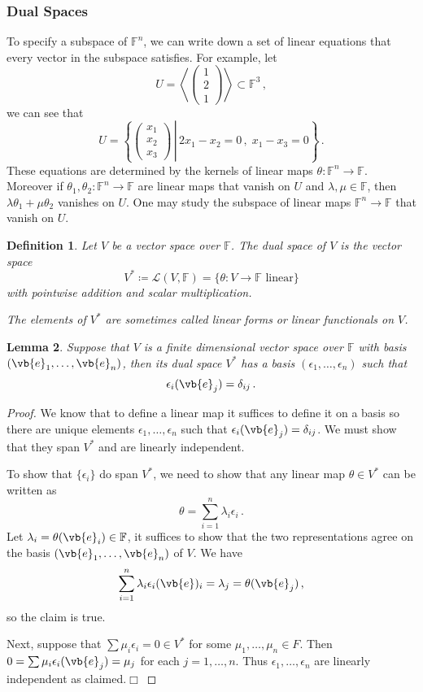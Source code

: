 \documentclass{article}
\theoremstyle{plain}\theoremheaderfont{\normalfont\itshape}\theorembodyfont{\rmfamily}\theoremseparator{.}\newtheorem*{rem}{Remark}\newtheorem*{ex}{Example}\newtheorem*{proof}{Proof}\newtheorem*{altp}{Alternative proof}
\theoremstyle{plain}\theoremheaderfont{\normalfont\bfseries}\theorembodyfont{\rmfamily}\theoremseparator{.}\newtheorem{thm}{Theorem}[section]\newtheorem{lem}[thm]{Lemma}\newtheorem{prop}[thm]{Proposition}\newtheorem*{cor}{Corollary}\newtheorem{defn}[thm]{Definition}\newtheorem{clm}[thm]{Claim}\newtheorem{clminproof}{Claim}
\theoremstyle{break}\theoremheaderfont{\normalfont\itshape}\theorembodyfont{\rmfamily}\theoremseparator{.\medskip}\newtheorem*{proofskip}{Proof}\newtheorem*{exs}{Examples}\newtheorem*{rems}{Remarks}
\theoremstyle{break}\theoremheaderfont{\normalfont\bfseries}\theorembodyfont{\rmfamily}\theoremseparator{.\medskip}\newtheorem{lemskip}[thm]{Lemma}\newtheorem{defnskip}[thm]{Definition}\newtheorem{propskip}[thm]{Proposition}\newtheorem{thmskip}[thm]{Theorem}
\numberwithin{equation}{section}
\newcommand{\qed}{\hfill\ensuremath{\Box}}
\begin{document}
	\subsubsection{Dual Spaces}
	To specify a subspace of \(\mathbb{F}^n\), we can write down a set of linear equations that every vector in the subspace satisfies. For example, let
	\[U=\left\langle \begin{pmatrix}
		1 \\ 2 \\ 1
	\end{pmatrix}\right\rangle\subset\mathbb{F}^3\,,\]
	we can see that
	\[U=\left\{\left.\begin{pmatrix}
		x_1 \\ x_2 \\ x_3
	\end{pmatrix}\,\right|\,2x_1-x_2=0\,,\;x_1-x_3=0\right\}\,.\]
	These equations are determined by the kernels of linear maps \(\theta:\mathbb{F}^n\to\mathbb{F}\). Moreover if \(\theta_1,\theta_2:\mathbb{F}^n\to\mathbb{F}\) are linear maps that vanish on \(U\) and \(\lambda,\mu\in\mathbb{F}\), then \(\lambda\theta_1+\mu\theta_2\) vanishes on \(U\). One may study the subspace of linear maps \(\mathbb{F}^n\to\mathbb{F}\) that vanish on \(U\).
	\begin{defn}
		Let \(V\) be a vector space over \(\mathbb{F}\). The \textit{dual space} of \(V\) is the vector space
		\[V^*\coloneqq\mathcal{L}(V,\mathbb{F})=\{\theta:V\to\mathbb{F}\text{ linear}\}\]
		with pointwise addition and scalar multiplication.

		The elements of \(V^*\) are sometimes called \textit{linear forms} or \textit{linear functionals} on \(V\).
	\end{defn}
	\begin{lem}
		Suppose that \(V\) is a finite dimensional vector space over \(\mathbb{F}\) with basis \((\vb{e}_1,\dots,\vb{e}_n)\), then its dual space \(V^*\) has a basis \((\epsilon_1,\dots,\epsilon_n)\) such that
		\[\epsilon_i(\vb{e}_j)=\delta_{ij}\,.\]
	\end{lem}
	\begin{proof}
		We know that to define a linear map it suffices to define it on a basis so there are unique elements \(\epsilon_1,\dots,\epsilon_n\) such that \(\epsilon_i(\vb{e}_j)=\delta_{ij}\). We must show that they span \(V^*\) and are linearly independent.

		To show that \(\{\epsilon_i\}\) do span \(V^*\), we need to show that any linear map \(\theta\in V^*\) can be written as
		\[\theta=\sum_{i=1}^{n}\lambda_i\epsilon_i\,.\]
		Let \(\lambda_i=\theta(\vb{e}_i)\in\mathbb{F}\), it suffices to show that the two representations agree on the basis \((\vb{e}_1,\dots,\vb{e}_n)\) of \(V\). We have
		\[\sum_{i=1}^{n}\lambda_i\epsilon_i(\vb{e})_i=\lambda_j=\theta(\vb{e}_j)\,,\]
		so the claim is true.

		Next, suppose that \(\sum \mu_i\epsilon_i=0\in V^*\) for some \(\mu_1,\dots,\mu_n\in F\). Then \(0=\sum \mu_i\epsilon_i(\vb{e}_j)=\mu_j\) for each \(j=1,\dots,n\). Thus \(\epsilon_1,\dots,\epsilon_n\) are linearly independent as claimed.\qed
	\end{proof}
\end{document}
